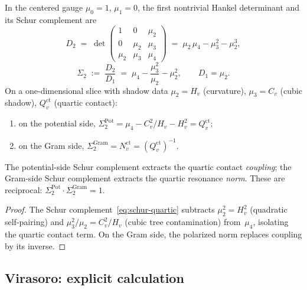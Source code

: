 \begin{theorem}[\ClaimStatusProvedHere]%
\label{thm:schur-complement-quartic}%
%
%
In the centered gauge $\mu_0 = 1$, $\mu_1 = 0$, the first
nontrivial Hankel determinant and its Schur complement are
\begin{equation}\label{eq:hankel-quartic}
D_2
\;=\;
\det\!\begin{pmatrix}
1 & 0 & \mu_2 \\
0 & \mu_2 & \mu_3 \\
\mu_2 & \mu_3 & \mu_4
\end{pmatrix}
\;=\;
\mu_2\,\mu_4 - \mu_3^2 - \mu_2^3,
\end{equation}
\begin{equation}\label{eq:schur-quartic}
\Sigma_2
\;:=\;
\frac{D_2}{D_1}
\;=\;
\mu_4 - \frac{\mu_3^2}{\mu_2} - \mu_2^2,
\qquad
D_1 = \mu_2.
\end{equation}
On a one-dimensional slice with shadow data
$\mu_2 = H_v$ \textup{(}curvature\textup{)},
$\mu_3 = C_v$ \textup{(}cubic shadow\textup{)},
$Q_v^{\mathrm{ct}}$ \textup{(}quartic contact\textup{)}:
\begin{enumerate}[label=\textup{(\roman*)}]
\item
on the potential side,
$\Sigma_2^{\mathrm{Pot}}
= \mu_4 - C_v^2/H_v - H_v^2
= Q_v^{\mathrm{ct}}$\textup;
\item
on the Gram side,
$\Sigma_2^{\mathrm{Gram}} = N_v^{\mathrm{ct}}
= (Q_v^{\mathrm{ct}})^{-1}$.
\end{enumerate}
The potential-side Schur complement extracts the quartic contact
\emph{coupling}; the Gram-side Schur complement extracts the quartic
resonance \emph{norm}. These are reciprocal: $\Sigma_2^{\mathrm{Pot}}
\cdot \Sigma_2^{\mathrm{Gram}} = 1$.
\end{theorem}

\begin{proof}
The Schur complement~\eqref{eq:schur-quartic} subtracts
$\mu_2^2 = H_v^2$ (quadratic self-pairing) and
$\mu_3^2/\mu_2 = C_v^2/H_v$ (cubic tree contamination)
from~$\mu_4$, isolating the quartic contact term.
On the Gram side, the polarized norm replaces coupling
by its inverse.
\end{proof}

\subsection{Virasoro: explicit calculation}%
\label{sec:virasoro-quartic-determinant}

